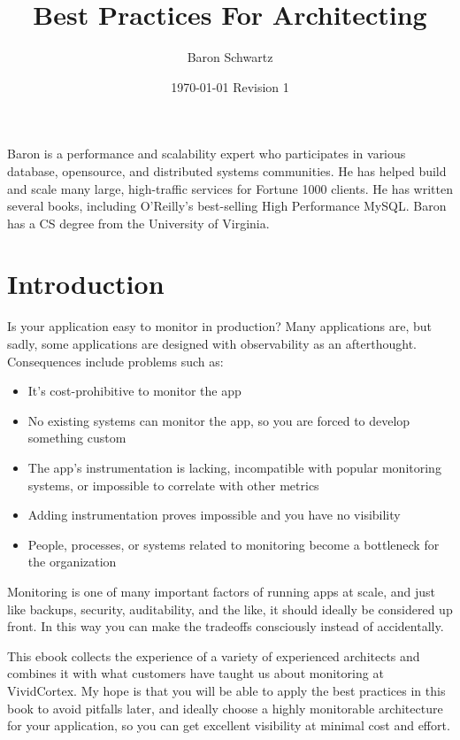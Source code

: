 \documentclass{vivid_layout}
\title{Best Practices For Architecting}{\fontsize{30pt}{15pt}\selectfont Highly Monitorable Applications}
\date{\color{white} \today{} \textbullet{} Revision 1}
\author{Baron Schwartz}{img/baron}
\begin{document}
\maketitle		%
\begin{bio}		%
Baron is a performance and scalability expert who participates in various
database, opensource, and distributed systems communities. He has helped build
and scale many large, high-traffic services for Fortune 1000 clients. He has
written several books, including O'Reilly's best-selling High Performance MySQL.
Baron has a CS degree from the University of Virginia.
\end{bio}
\tableofcontents	%

\section{Introduction}

Is your application easy to monitor in production? Many applications are, but
sadly, some applications are designed with observability as an afterthought.
Consequences include problems such as:

\begin{itemize}
\item It's cost-prohibitive to monitor the app
\item No existing systems can monitor the app, so you are forced to develop
something custom
\item The app's instrumentation is lacking, incompatible with popular monitoring
systems, or impossible to correlate with other metrics
\item Adding instrumentation proves impossible and you have no visibility
\item People, processes, or systems related to monitoring become a bottleneck for the organization
\end{itemize}

Monitoring is one of many important factors of running apps at scale, and just
like backups, security, auditability, and the like, it should ideally be
considered up front. In this way you can make the tradeoffs consciously instead
of accidentally.

This ebook collects the experience of a variety of experienced architects and
combines it with what customers have taught us about monitoring at
VividCortex. My hope is that you will be able to apply the best practices in
this book to avoid pitfalls later, and ideally choose a highly monitorable
architecture for your application, so you can get excellent visibility at
minimal cost and effort. 
\end{document}
